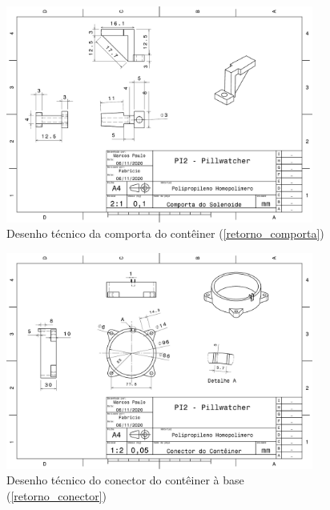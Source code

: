 \begin{apendicesenv}
\begin{figure}[H]
    \centering
    \includegraphics[width=0.9\textwidth]{figuras/estrutura/Desenhos/Comporta_Solenoide.pdf}
    \caption{Desenho técnico da comporta do contêiner (\ref{retorno_comporta})}
    \label{fig:comporta}
\end{figure}

\begin{figure}[H]
    \centering
    \includegraphics[width=0.9\textwidth]{figuras/estrutura/Desenhos/ConectorContainer.pdf}
    \caption{Desenho técnico do conector do contêiner à base (\ref{retorno_conector})}
    \label{fig:conector}
\end{figure}


\end{apendicesenv}

